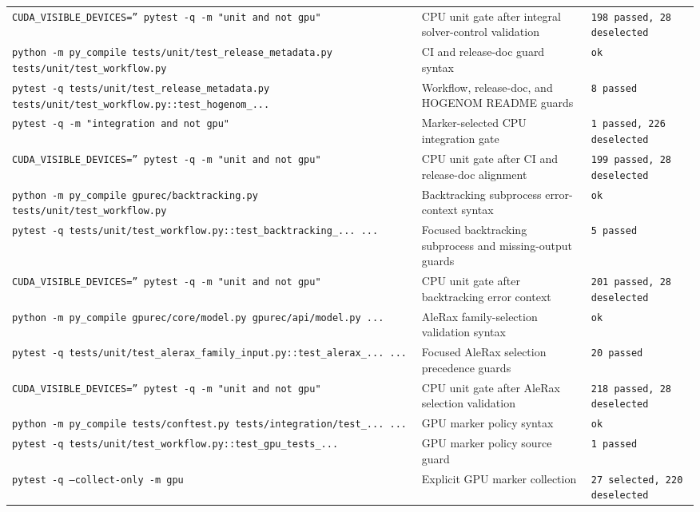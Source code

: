 \documentclass[11pt]{article}
\begin{document}
\begin{center}
\begin{tabular}{lll}
\texttt{CUDA\_VISIBLE\_DEVICES='' pytest -q -m "unit and not gpu"} &
CPU unit gate after integral solver-control validation &
\texttt{198 passed, 28 deselected} \\
\texttt{python -m py\_compile tests/unit/test\_release\_metadata.py tests/unit/test\_workflow.py} &
CI and release-doc guard syntax &
\texttt{ok} \\
\texttt{pytest -q tests/unit/test\_release\_metadata.py tests/unit/test\_workflow.py::test\_hogenom\_...} &
Workflow, release-doc, and HOGENOM README guards &
\texttt{8 passed} \\
\texttt{pytest -q -m "integration and not gpu"} &
Marker-selected CPU integration gate &
\texttt{1 passed, 226 deselected} \\
\texttt{CUDA\_VISIBLE\_DEVICES='' pytest -q -m "unit and not gpu"} &
CPU unit gate after CI and release-doc alignment &
\texttt{199 passed, 28 deselected} \\
\texttt{python -m py\_compile gpurec/backtracking.py tests/unit/test\_workflow.py} &
Backtracking subprocess error-context syntax &
\texttt{ok} \\
\texttt{pytest -q tests/unit/test\_workflow.py::test\_backtracking\_... ...} &
Focused backtracking subprocess and missing-output guards &
\texttt{5 passed} \\
\texttt{CUDA\_VISIBLE\_DEVICES='' pytest -q -m "unit and not gpu"} &
CPU unit gate after backtracking error context &
\texttt{201 passed, 28 deselected} \\
\texttt{python -m py\_compile gpurec/core/model.py gpurec/api/model.py ...} &
AleRax family-selection validation syntax &
\texttt{ok} \\
\texttt{pytest -q tests/unit/test\_alerax\_family\_input.py::test\_alerax\_... ...} &
Focused AleRax selection precedence guards &
\texttt{20 passed} \\
\texttt{CUDA\_VISIBLE\_DEVICES='' pytest -q -m "unit and not gpu"} &
CPU unit gate after AleRax selection validation &
\texttt{218 passed, 28 deselected} \\
\texttt{python -m py\_compile tests/conftest.py tests/integration/test\_... ...} &
GPU marker policy syntax &
\texttt{ok} \\
\texttt{pytest -q tests/unit/test\_workflow.py::test\_gpu\_tests\_...} &
GPU marker policy source guard &
\texttt{1 passed} \\
\texttt{pytest -q --collect-only -m gpu} &
Explicit GPU marker collection &
\texttt{27 selected, 220 deselected} \\

\end{tabular}
\end{center}
\end{document}
